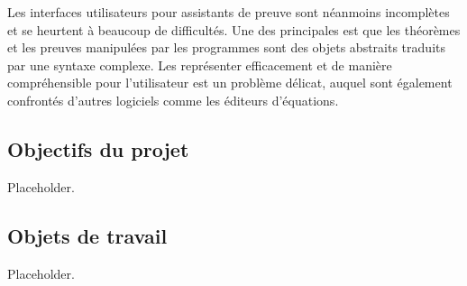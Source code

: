 Les interfaces utilisateurs pour assistants de preuve sont néanmoins incomplètes et se heurtent à beaucoup de difficultés. Une des principales est que les théorèmes et les preuves manipulées par les programmes sont des objets abstraits traduits par une syntaxe complexe. Les représenter efficacement et de manière compréhensible pour l'utilisateur est un problème délicat, auquel sont également confrontés d'autres logiciels comme les éditeurs d'équations.

\subsection{Objectifs du projet}

Placeholder.

\subsection{Objets de travail}

Placeholder.